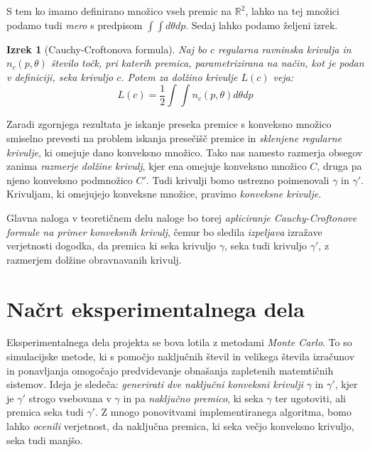 \documentclass[a4paper]{article}
\newtheorem{izrek}{Izrek}
\begin{document}
S tem ko imamo definirano množico vseh premic na $\mathbb{R}^2$, lahko na tej množici podamo tudi \textit{mero} s  predpisom $ \int \int d\theta dp$. Sedaj lahko podamo željeni izrek.

\begin{izrek}[Cauchy-Croftonova formula]
 Naj bo $c$ regularna ravninska krivulja in $n_c (p, \theta)$  število točk, pri katerih premica, parametrizirana na način, kot je podan v definiciji, seka krivuljo $c$. Potem za dolžino krivulje $L(c)$ veja: $$L(c) = \frac{1}{2}\int \int n_c (p, \theta) d\theta dp $$
 \end{izrek}

\vspace{3 mm}

Zaradi zgornjega rezultata je iskanje preseka premice s konveksno množico smiselno prevesti na problem iskanja presečišč premice in \textit{sklenjene regularne krivulje}, ki omejuje dano konveksno množico. Tako nas namesto razmerja obsegov zanima \textit{razmerje dolžine krivulj}, kjer ena omejuje konveksno množico $C$, druga pa njeno konveksno podmnožico $C'$. Tudi krivulji bomo ustrezno poimenovali $\gamma$ in $\gamma '$. Krivuljam, ki omejujejo konveksne množice, pravimo \textit{konveksne krivulje}. 

Glavna naloga v teoretičnem delu naloge bo torej \textit{apliciranje Cauchy-Croftonove formule na primer konveksnih krivulj}, čemur bo sledila \textit{izpeljava} izražave verjetnosti dogodka, da premica ki seka krivuljo $\gamma$, seka tudi krivuljo $\gamma'$, z razmerjem dolžine obravnavanih krivulj. 



\section{Načrt eksperimentalnega dela}

Eksperimentalnega dela projekta se bova lotila z metodami \textit{Monte Carlo}. To so simulacijske metode, ki s pomočjo naključnih števil in velikega števila izračunov in ponavljanja omogočajo predvidevanje obnašanja zapletenih matemtičnih sistemov. Ideja je sledeča: \textit{generirati dve naključni konveksni krivulji} $\gamma$ in $\gamma'$, kjer je $\gamma'$ strogo vsebovana v $\gamma$ in pa \textit{naključno premico}, ki seka $\gamma$ ter ugotoviti, ali premica seka tudi $\gamma'$. Z mnogo ponovitvami implementiranega algoritma, bomo lahko \textit{ocenili} verjetnost, da naključna premica, ki seka večjo konveksno krivuljo, seka tudi manjšo.
\end{document}
